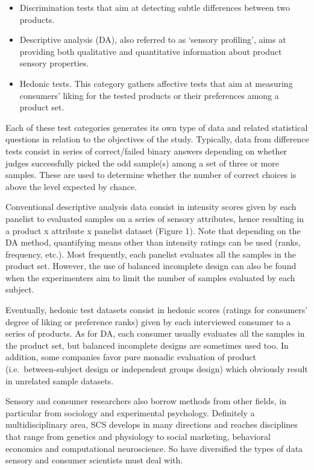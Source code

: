 \documentclass[
]{book}
\providecommand{\tightlist}{%
  \setlength{\itemsep}{0pt}\setlength{\parskip}{0pt}}
\begin{document}
\begin{itemize}
\tightlist
\item
  Discrimination tests that aim at detecting subtle differences between two products.
\item
  Descriptive analysis (DA), also referred to as `sensory profiling', aims at providing both qualitative and quantitative information about product sensory properties.
\item
  Hedonic tests. This category gathers affective tests that aim at measuring consumers' liking for the tested products or their preferences among a product set.
\end{itemize}

Each of these test categories generates its own type of data and related statistical questions in relation to the objectives of the study. Typically, data from difference tests consist in series of correct/failed binary answers depending on whether judges successfully picked the odd sample(s) among a set of three or more samples. These are used to determine whether the number of correct choices is above the level expected by chance.

Conventional descriptive analysis data consist in intensity scores given by each panelist to evaluated samples on a series of sensory attributes, hence resulting in a product x attribute x panelist dataset (Figure 1). Note that depending on the DA method, quantifying means other than intensity ratings can be used (ranks, frequency, etc.). Most frequently, each panelist evaluates all the samples in the product set. However, the use of balanced incomplete design can also be found when the experimenters aim to limit the number of samples evaluated by each subject.

Eventually, hedonic test datasets consist in hedonic scores (ratings for consumers' degree of liking or preference ranks) given by each interviewed consumer to a series of products. As for DA, each consumer usually evaluates all the samples in the product set, but balanced incomplete designs are sometimes used too. In addition, some companies favor pure monadic evaluation of product (i.e.~between-subject design or independent groups design) which obviously result in unrelated sample datasets.

Sensory and consumer researchers also borrow methods from other fields, in particular from sociology and experimental psychology. Definitely a multidisciplinary area, SCS develops in many directions and reaches disciplines that range from genetics and physiology to social marketing, behavioral economics and computational neuroscience. So have diversified the types of data sensory and consumer scientists must deal with.
\end{document}
